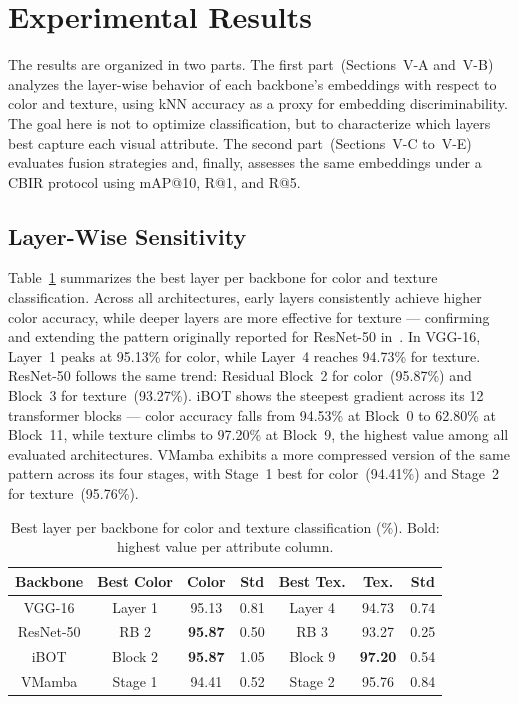 \documentclass[conference]{IEEEtran}
\begin{document}
\section{Experimental Results}

The results are organized in two parts.
The first part~(Sections~V-A and~V-B) analyzes the layer-wise behavior
of each backbone's embeddings with respect to color and texture, using
kNN accuracy as a proxy for embedding discriminability.
The goal here is not to optimize classification, but to characterize
which layers best capture each visual attribute.
The second part~(Sections~V-C to~V-E) evaluates fusion strategies and,
finally, assesses the same embeddings under a CBIR protocol using
mAP@10, R@1, and R@5.

\subsection{Layer-Wise Sensitivity}

Table~\ref{tab_best_layer} summarizes the best layer per backbone for
color and texture classification.
Across all architectures, early layers consistently achieve higher color
accuracy, while deeper layers are more effective for texture — confirming
and extending the pattern originally reported for ResNet-50
in~\cite{b2}.
In VGG-16, Layer~1 peaks at 95.13\% for color, while Layer~4 reaches
94.73\% for texture.
ResNet-50 follows the same trend: Residual Block~2 for color~(95.87\%)
and Block~3 for texture~(93.27\%).
iBOT shows the steepest gradient across its 12 transformer blocks —
color accuracy falls from 94.53\% at Block~0 to 62.80\% at Block~11,
while texture climbs to 97.20\% at Block~9, the highest value among all
evaluated architectures.
VMamba exhibits a more compressed version of the same pattern across its
four stages, with Stage~1 best for color~(94.41\%) and Stage~2 for
texture~(95.76\%).

\begin{table}[htbp]
\caption{Best layer per backbone for color and texture classification
         (\%). Bold: highest value per attribute column.}
\begin{center}
\begin{tabular}{c|c|c|c|c|c|c}
\hline
\textbf{Backbone} & \textbf{Best Color} & \textbf{Color} & \textbf{Std}
                  & \textbf{Best Tex.}  & \textbf{Tex.}  & \textbf{Std} \\
\hline
VGG-16    & Layer 1 & 95.13          & 0.81 & Layer 4 & 94.73          & 0.74 \\
ResNet-50 & RB 2    & \textbf{95.87} & 0.50 & RB 3    & 93.27          & 0.25 \\
iBOT      & Block 2 & \textbf{95.87} & 1.05 & Block 9 & \textbf{97.20} & 0.54 \\
VMamba    & Stage 1 & 94.41          & 0.52 & Stage 2 & 95.76          & 0.84 \\
\hline
\end{tabular}
\label{tab_best_layer}
\end{center}
\end{table}
\end{document}
